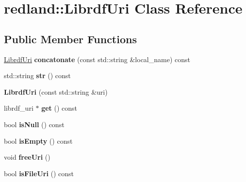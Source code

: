 \hypertarget{classredland_1_1LibrdfUri}{}\section{redland\+:\+:Librdf\+Uri Class Reference}
\label{classredland_1_1LibrdfUri}
\subsection*{Public Member Functions}
\begin{DoxyCompactItemize}
\item 
\mbox{\label{classredland_1_1LibrdfUri_a3630cf904c9e4546fb6d6c175ed6c66e}} 
\hyperlink{classredland_1_1LibrdfUri}{Librdf\+Uri} {\bfseries concatonate} (const std\+::string \&local\+\_\+name) const
\item 
\mbox{\label{classredland_1_1LibrdfUri_acaeb8a0d4b6f493805ecc1b198807e1c}} 
std\+::string {\bfseries str} () const
\item 
\mbox{\label{classredland_1_1LibrdfUri_a36c5c589ae207ad6294e10be2bb8df17}} 
{\bfseries Librdf\+Uri} (const std\+::string \&uri)
\item 
\mbox{\label{classredland_1_1LibrdfUri_a1858bf7c3afae7d6d8ed2dca47e9cf55}} 
librdf\+\_\+uri $\ast$ {\bfseries get} () const
\item 
\mbox{\label{classredland_1_1LibrdfUri_ae9a8237bcb9cba0f2d87f2d980f579f3}} 
bool {\bfseries is\+Null} () const
\item 
\mbox{\label{classredland_1_1LibrdfUri_a13f1a7bc775cd79b6bb4dc6cd31b5d53}} 
bool {\bfseries is\+Empty} () const
\item 
\mbox{\label{classredland_1_1LibrdfUri_aa07e6315dc3428b6d864deb00cda48e1}} 
void {\bfseries free\+Uri} ()
\item 
\mbox{\label{classredland_1_1LibrdfUri_a770d47b63c041e39761f8dd46b0bf8b5}} 
bool {\bfseries is\+File\+Uri} () const
\item 

\end{DoxyCompactItemize}
